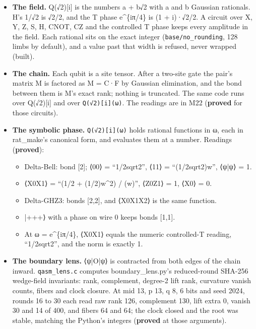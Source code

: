 \begin{itemize}
\item \textbf{The field.} Q(√2)[i] is the numbers a + b√2 with a and b Gaussian rationals. H's 1/√2 is √2/2, and the T phase e\textasciicircum{}\{iπ/4\} is (1 + i)·√2/2. A circuit over X, Y, Z, S, H, CNOT, CZ and the controlled T phase keeps every amplitude in the field. Each rational sits on the exact integer (\texttt{base/\allowbreak{}no\_\allowbreak{}rounding}, 128 limbs by default), and a value past that width is refused, never wrapped (built).
\item \textbf{The chain.} Each qubit is a site tensor. After a two-site gate the pair's matrix M is factored as M = C·F by Gaussian elimination, and the bond between them is M's exact rank; nothing is truncated. The same code runs over Q(√2)[i] and over \texttt{Q(√2)[i](ω)}. The readings are in M22 (\textbf{proved} for those circuits).
\item \textbf{The symbolic phase.} \texttt{Q(√2)[i](ω)} holds rational functions in ω, each in rat\_\allowbreak{}make's canonical form, and evaluates them at a number. Readings (\textbf{proved}):

\begin{itemize}
\item Delta-Bell: bond [2]; ⟨00⟩ = “1/2sqrt2”, ⟨11⟩ = “(1/2sqrt2)w”, ⟨ψ|ψ⟩ = 1.
\item ⟨X0X1⟩ = “(1/2 + (1/2)w\textasciicircum{}2) / (w)”, ⟨Z0Z1⟩ = 1, ⟨X0⟩ = 0.
\item Delta-GHZ3: bonds [2,2], and ⟨X0X1X2⟩ is the same function.
\item |+++⟩ with a phase on wire 0 keeps bonds [1,1].
\item At ω = e\textasciicircum{}\{iπ/4\}, ⟨X0X1⟩ equals the numeric controlled-T reading, “1/2sqrt2”, and the norm is exactly 1.
\end{itemize}
\item \textbf{The boundary lens.} ⟨ψ|O|ψ⟩ is contracted from both edges of the chain inward. \texttt{qasm\_\allowbreak{}lens.\allowbreak{}c} computes boundary\_\allowbreak{}lens.py's reduced-round SHA-256 wedge-field invariants: rank, complement, degree-2 lift rank, curvature vanish counts, fibers and clock closure. At mid 13, p 13, q 8, 6 bits and seed 2024, rounds 16 to 30 each read raw rank 126, complement 130, lift extra 0, vanish 30 and 14 of 400, and fibers 64 and 64; the clock closed and the root was stable, matching the Python's integers (\textbf{proved} at those arguments).


\end{itemize}
